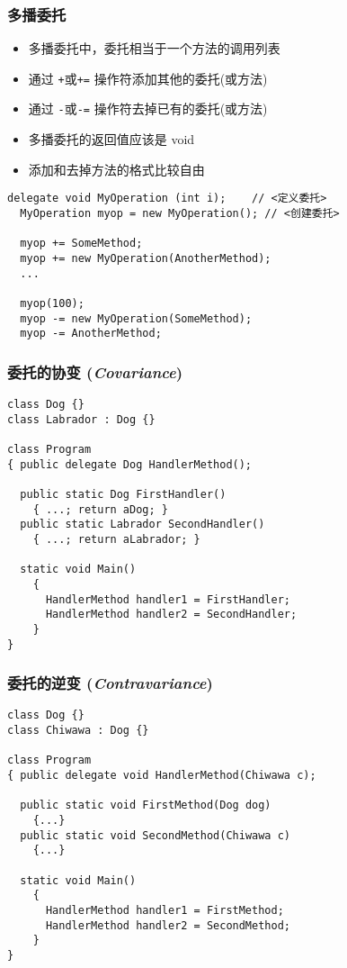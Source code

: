 \begin{frame}[fragile]
\frametitle{多播委托}
\begin{itemize}
\setlength{\itemsep}{4pt plus 1pt}
\item 多播委托中，委托相当于一个方法的调用列表
\item 通过 \texttt{+}或\texttt{+=} 操作符添加其他的委托(或方法)
\item 通过 \texttt{-}或\texttt{-=} 操作符去掉已有的委托(或方法)
\item 多播委托的返回值应该是 void
\item 添加和去掉方法的格式比较自由
\end{itemize}
\begin{lstlisting}[escapeinside=<>]
  delegate void MyOperation (int i);    // <定义委托>
  MyOperation myop = new MyOperation(); // <创建委托>

  myop += SomeMethod;
  myop += new MyOperation(AnotherMethod);
  ...

  myop(100);
  myop -= new MyOperation(SomeMethod);
  myop -= AnotherMethod;

\end{lstlisting}
\end{frame}

\begin{frame}[fragile]
\frametitle{委托的协变 (\textit{Covariance})}
\begin{lstlisting}
class Dog {}
class Labrador : Dog {}

class Program
{ public delegate Dog HandlerMethod();

  public static Dog FirstHandler()  
    { ...; return aDog; }
  public static Labrador SecondHandler()
    { ...; return aLabrador; }

  static void Main() 
    {
      HandlerMethod handler1 = FirstHandler;
      HandlerMethod handler2 = SecondHandler;
    }
}
\end{lstlisting}
\end{frame}

\begin{frame}[fragile]
\frametitle{委托的逆变 (\textit{Contravariance})}
\begin{lstlisting}
class Dog {}
class Chiwawa : Dog {}
 
class Program
{ public delegate void HandlerMethod(Chiwawa c);
 
  public static void FirstMethod(Dog dog)
    {...}
  public static void SecondMethod(Chiwawa c)
    {...}
 
  static void Main()
    {
      HandlerMethod handler1 = FirstMethod;
      HandlerMethod handler2 = SecondMethod;
    }
}
\end{lstlisting}
\end{frame}

